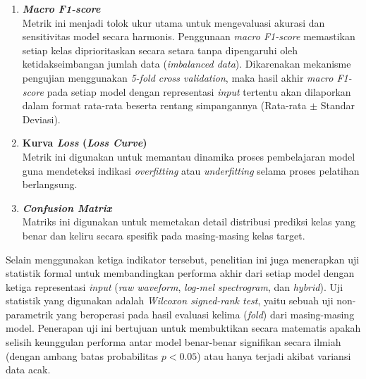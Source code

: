 \begin{enumerate}
    \item \textbf{\textit{Macro F1-score}} \\
    Metrik ini menjadi tolok ukur utama untuk mengevaluasi akurasi dan sensitivitas model secara harmonis.
    Penggunaan \textit{macro F1-score} memastikan setiap kelas diprioritaskan secara setara tanpa dipengaruhi oleh ketidakseimbangan jumlah data (\textit{imbalanced data}).
    Dikarenakan mekanisme pengujian menggunakan \textit{5-fold cross validation}, maka hasil akhir \textit{macro F1-score} pada setiap model dengan representasi \textit{input} tertentu akan dilaporkan dalam format rata-rata beserta rentang simpangannya (Rata-rata $\pm$ Standar Deviasi).
    \item \textbf{Kurva \textit{Loss} (\textit{Loss Curve})} \\
    Metrik ini digunakan untuk memantau dinamika proses pembelajaran model guna mendeteksi indikasi \textit{overfitting} atau \textit{underfitting} selama proses pelatihan berlangsung.
    \item \textbf{\textit{Confusion Matrix}} \\ 
    Matriks ini digunakan untuk memetakan detail distribusi prediksi kelas yang benar dan keliru secara spesifik pada masing-masing kelas target.
\end{enumerate}
\medskip

Selain menggunakan ketiga indikator tersebut, penelitian ini juga menerapkan uji statistik formal untuk membandingkan performa akhir dari setiap model dengan ketiga representasi \textit{input} (\textit{raw waveform}, \textit{log-mel spectrogram}, dan \textit{hybrid}).
Uji statistik yang digunakan adalah \textit{Wilcoxon signed-rank test}, yaitu sebuah uji non-parametrik yang beroperasi pada hasil evaluasi kelima (\textit{fold}) dari masing-masing model.
Penerapan uji ini bertujuan untuk membuktikan secara matematis apakah selisih keunggulan performa antar model benar-benar signifikan secara ilmiah (dengan ambang batas probabilitas $p < 0.05$) atau hanya terjadi akibat variansi data acak. \par
